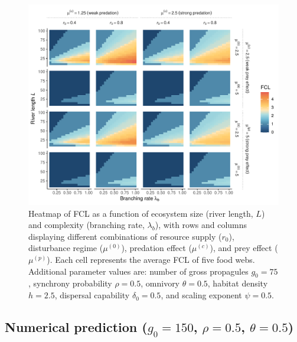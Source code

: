 \begin{figure}
\centering
\includegraphics{../data_fmt/fig_rho05_g75_theta05.pdf}
\caption{Heatmap of FCL as a function of ecosystem size (river length,
\(L\)) and complexity (branching rate, \(\lambda_b\)), with rows and
columns displaying different combinations of resource supply (\(r_0\)),
disturbance regime (\(\mu^{(0)}\)), predation effect (\(\mu^{(c)}\)),
and prey effect (\(\mu^{(p)}\)). Each cell represents the average FCL of
five food webs. Additional parameter values are: number of gross
propagules \(g_0=75\), synchrony probability \(\rho=0.5\), omnivory
\(\theta=0.5\), habitat density \(h=2.5\), dispersal capability
\(\delta_0=0.5\), and scaling exponent \(\psi=0.5\).}
\end{figure}

\newpage

\subsection{\texorpdfstring{Numerical prediction (\(g_0=150\),
\(\rho=0.5\),
\(\theta=0.5\))}{Numerical prediction (g\_0=150, \textbackslash rho=0.5, \textbackslash theta=0.5)}}\label{numerical-prediction-g_0150-rho0.5-theta0.5}

